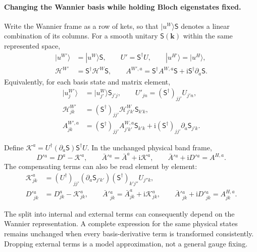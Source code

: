 \documentclass[prx,amsmath,amssymb,superscriptaddress,longbibliography]{revtex4-2}
\newcommand{\ii}{\mathrm{i}}
\begin{document}
\paragraph{Changing the Wannier basis while holding Bloch eigenstates fixed.}
Write the Wannier frame as a row of kets, so that
$|u^{W}\rangle\mathsf S$ denotes a linear combination of its columns.
For a smooth unitary $\mathsf S(\bm k)$ within the same represented space,
\begin{align}
 |u^{W'}\rangle&=|u^W\rangle\mathsf S,\qquad U'=\mathsf S^\dagger U,\qquad
 |u^{H'}\rangle=|u^H\rangle,\nonumber\\
 \mathcal H^{W'}&=\mathsf S^\dagger\mathcal H^W\mathsf S,\qquad
 A^{W',a}=\mathsf S^\dagger A^{W,a}\mathsf S
                         +\ii\mathsf S^\dagger\partial_a\mathsf S.
 \label{eq:Wannier-frame-change}
\end{align}
Equivalently, for each basis state and matrix element,
\begin{align}
 |u_j^{W'}\rangle&=|u_{j'}^W\rangle\mathsf S_{j'j},\qquad
 U'_{jn}=(\mathsf S^\dagger)_{jj'}U_{j'n},\nonumber\\
 \mathcal H_{jk}^{W'}&=
 (\mathsf S^\dagger)_{jj'}\mathcal H_{j'k'}^W\mathsf S_{k'k},\nonumber\\
 A_{jk}^{W',a}&=
 (\mathsf S^\dagger)_{jj'}A_{j'k'}^{W,a}\mathsf S_{k'k}
 +\ii(\mathsf S^\dagger)_{jj'}\partial_a\mathsf S_{j'k}.
 \label{eq:Wannier-frame-components}
\end{align}

Define $\mathcal K^a=U^\dagger(\partial_a\mathsf S)\mathsf S^\dagger U$.
In the unchanged physical band frame,
\begin{equation}
 D'{}^a=D^a-\mathcal K^a,\qquad
 \bar A'{}^a=\bar A^a+\ii\mathcal K^a,\qquad
 \bar A'{}^a+\ii D'{}^a=A^{H,a}.
 \label{eq:connection-cancellation}
\end{equation}
The compensating terms can also be read element by element:
\begin{align}
 \mathcal K_{jk}^a&=
 (U^\dagger)_{jj'}(\partial_a\mathsf S_{j'k'})(\mathsf S^\dagger)_{k'j''}U_{j''k},\nonumber\\
 D'{}_{jk}^a&=D_{jk}^a-\mathcal K_{jk}^a,\qquad
 \bar A'{}_{jk}^a=\bar A_{jk}^a+\ii\mathcal K_{jk}^a,\qquad
 \bar A'{}_{jk}^a+\ii D'{}_{jk}^a=A_{jk}^{H,a}.
 \label{eq:connection-cancellation-components}
\end{align}

The split into internal and external terms can consequently depend on the
Wannier representation. A complete expression for the same physical states
remains unchanged when every basis-derivative term is transformed consistently.
Dropping external terms is a model approximation, not a general gauge fixing.
\end{document}
